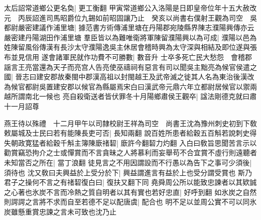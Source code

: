 太后詔常道鄉公更名奐|{
	更工衡翻}
甲寅常道鄉公入洛陽是日即皇帝位年十五大赦改元　丙辰詔進司馬昭爵位九錫如前昭固讓乃止　癸亥以尚書右僕射王觀為司空　吳都尉嚴密建議作浦里塘|{
	據范書方術傳浦里塘在丹陽郡宛陵縣界陳志濮陽興傳亦云嚴密建丹陽湖田作浦里塘}
羣臣皆以為難唯衛將軍陳留濮陽興以為可成|{
	濮陽以邑為姓陳留風俗傳漢有長沙太守濮陽逸吳主休居會稽時興為太守深與相結及即位遂與張布並見信用}
遂會諸軍民就作功費不可勝數|{
	數音升}
士卒多死亡民大愁怨　會稽郡謡言王亮當還為天子而亮宫人告亮使巫禱祠有惡言有司以聞吳主黜亮為候官侯遣之國|{
	晉志曰建安郡故秦閩中郡漢高祖以封閩越王及武帝滅之徙其人名為東治後漢改為候官都尉吳置建安郡以候官為縣屬焉宋白曰漢武帝元鼎六年立都尉居候官以禦兩越所謂南北一候也}
亮自殺衛送者皆伏罪冬十月陽鄉肅侯王觀卒|{
	諡法剛德克就曰肅}
十一月詔尊

燕王待以殊禮　十二月甲午以司隸校尉王祥為司空　尚書王沈為豫州刺史初到下敎敕屬城及士民曰若有能陳長吏可否|{
	長知兩翻}
說百姓所患者給穀五百斛若說刺史得失朝政寛猛者給穀千斛主簿陳廞禇䂮|{
	廞許今翻䂮力灼翻}
入白曰敎旨思聞苦言示以勸賞竊恐拘介之士或憚賞而不言貪昧之人將慕利而妄舉苟不合宜賞不虛行則遠聽者未知當否之所在|{
	當丁浪翻}
徒見言之不用因謂設而不行愚以為告下之事可少須後|{
	須待也}
沈又敎曰夫興益於上受分於下|{
	興益謂進言有益於上也受分謂受賞也}
斯乃君子之操何不言之有禇䂮復白曰|{
	復扶又翻下同}
堯舜周公所以能致忠諫者以其欵誠之心著也氷炭不言而冷熱之質自明者以其有實也若好忠直|{
	好呼到翻}
如氷炭之自然則諤諤之言將不求而自至若德不足以配唐虞|{
	配合也}
明不足以並周公實不可以同氷炭雖懸重賞忠諫之言未可致也沈乃止

